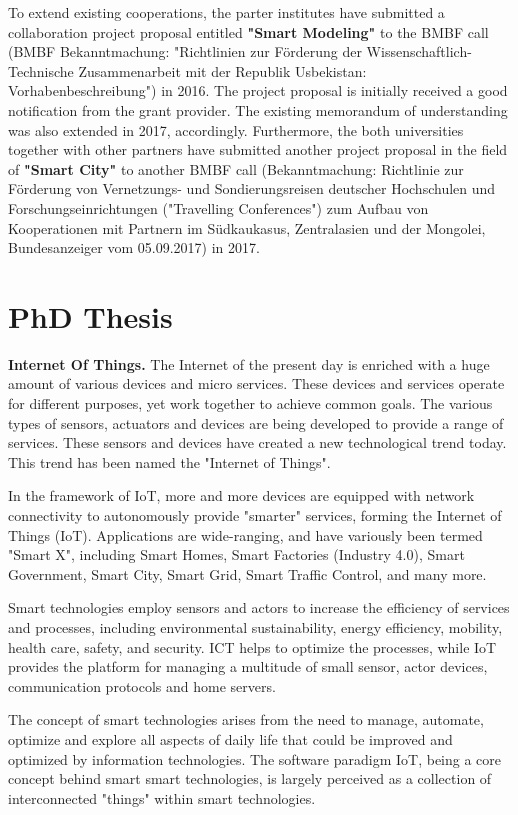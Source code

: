 \documentclass[10pt, oneside]{article}
\begin{document}
To extend existing cooperations, the parter institutes have submitted a collaboration project proposal entitled \textbf{"Smart Modeling"} to the BMBF call (BMBF Bekanntmachung: "Richtlinien zur Förderung der Wissenschaftlich-Technische Zusammenarbeit mit der Republik Usbekistan: Vorhabenbeschreibung") in 2016. The project proposal is initially received a good notification from the grant provider. The existing memorandum of understanding was also extended in 2017, accordingly. Furthermore, the both universities together with other partners have submitted another project proposal in the field of \textbf{"Smart City"} to another BMBF call (Bekanntmachung: Richtlinie zur Förderung von Vernetzungs- und Sondierungsreisen deutscher Hochschulen und Forschungseinrichtungen ("Travelling Conferences") zum Aufbau von Kooperationen mit Partnern im Südkaukasus, Zentralasien und der Mongolei, Bundesanzeiger vom 05.09.2017) in 2017.

\section{PhD Thesis}
\textbf{Internet Of Things.} The Internet of the present day is enriched with a huge amount of various devices and micro services. These devices and services operate for different purposes, yet work together to achieve common goals. The various types of sensors, actuators and devices are being developed to provide a range of services. These sensors and devices have created a new technological trend today. This trend has been named the "Internet of Things". 

In the framework of IoT, more and more devices are equipped with network connectivity to autonomously provide "smarter" services, forming the Internet of Things (IoT). Applications are wide-ranging, and have variously been termed "Smart X", including Smart Homes, Smart Factories (Industry 4.0), Smart Government, Smart City, Smart Grid, Smart Traffic Control, and many more.

Smart technologies employ sensors and actors to increase the efficiency of services and processes, including environmental sustainability, energy efficiency, mobility, health care, safety, and security. ICT helps to optimize the processes, while IoT provides the platform for managing a multitude of small sensor, actor devices, communication protocols and home servers.

The concept of smart technologies arises from the need to manage, automate, optimize and explore all aspects of daily life that could be improved and optimized by information technologies. The software paradigm IoT, being a core concept behind smart smart technologies, is largely perceived as a collection of interconnected "things" within smart technologies.
\end{document}
